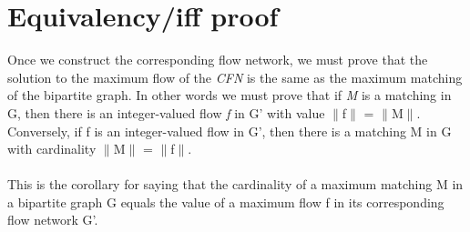 \documentclass[12pt, letterpaper]{article}
\begin{document}
\section{Equivalency/iff proof}
Once we construct the corresponding flow network, we must prove that the solution to the maximum flow of the \textit{CFN} is the same as the maximum matching of the bipartite graph. In other words we must prove that if \textit{M} is a matching in G, then there is an integer-valued flow \textit{f} in G' with value $\|$f$\|$ = $\|$M$\|$. Conversely, if f is an integer-valued flow in G', then there is a matching M in G with cardinality $\|$M$\|$ = $\|$f$\|$.\\\\
This is the corollary for saying that the cardinality of a maximum matching M in a bipartite graph G equals the value of a maximum flow f in its corresponding flow network G'.
	
\end{document}
